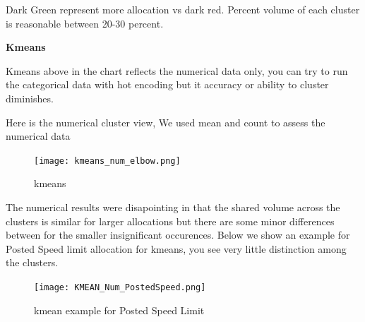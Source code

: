 \documentclass[conference]{IEEEtran}
\begin{document}
 Dark Green represent more allocation vs dark red.  Percent volume of each cluster is reasonable between 20-30 percent.

\begin{center} 
\textbf{Kmeans} 
\end{center}
Kmeans above in the chart reflects the numerical data only,  you can try to run the categorical data with hot encoding but it accuracy or ability to cluster diminishes.

Here is the numerical cluster view,  We used mean and count to assess the numerical data

\begin{figure}[!h]
	\texttt{[image: kmeans\_num\_elbow.png]}
	\caption{kmeans}
	\label{fig: Kmeans Elbow Chart}
 \end{figure}
The numerical results were disapointing in that the shared volume across the clusters is similar for larger allocations but there are some minor differences between for the smaller insignificant occurences. Below we show an example for Posted Speed limit allocation for kmeans, you see very little distinction among the clusters.

\begin{figure}[!h]
	\texttt{[image: KMEAN\_Num\_PostedSpeed.png]}
	\caption{kmean example for Posted Speed Limit}
	\label{fig: Example View for Kmeans Posted Speed Limit Cluster Allocation}
 \end{figure}
\end{document}
